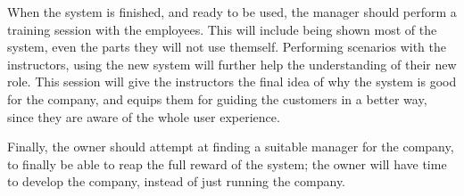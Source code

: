 When the system is finished, and ready to be used, the manager should perform
a training session with the employees. This will include being shown most of 
the system, even the parts they will not use themself. Performing scenarios
with the instructors, using the new system will further help the understanding
of their new role. This session will give the instructors the final idea
of why the system is good for the company, and equips them for guiding the 
customers in a better way, since they are aware of the whole user experience.

Finally, the owner should attempt at finding a suitable manager for the 
company, to finally be able to reap the full reward of the system; the owner
will have time to develop the company, instead of just running the company.

\newpage
